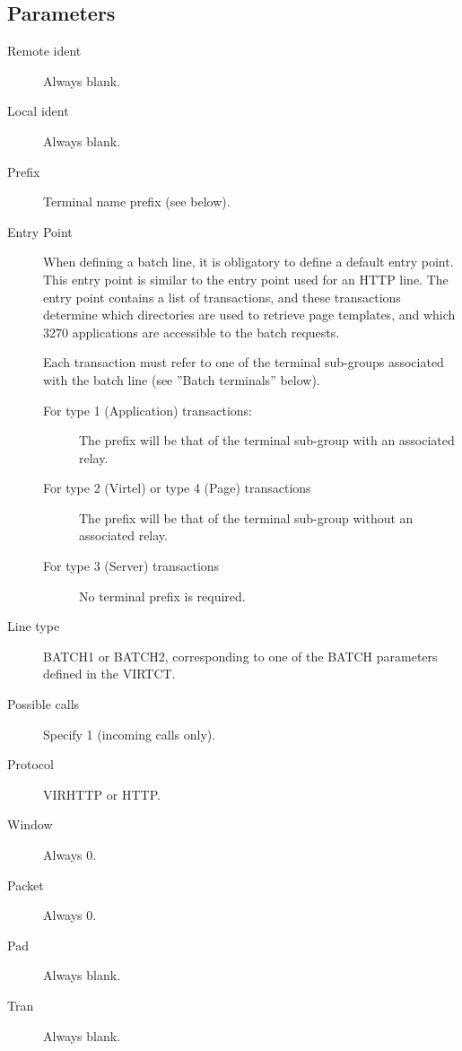 \documentclass[letterpaper,10pt,english]{sphinxmanual}
\begin{document}


\subsection{Parameters}
\label{\detokenize{connectivity_guide:id10}}\label{\detokenize{connectivity_guide:index-32}}\begin{description}
\item[{Remote ident}] \leavevmode
Always blank.

\item[{Local ident}] \leavevmode
Always blank.

\item[{Prefix}] \leavevmode
Terminal name prefix (see below).

\item[{Entry Point}] \leavevmode
When defining a batch line, it is obligatory to define a default entry point. This entry point is similar to the entry point used for an HTTP line. The entry point contains a list of transactions, and these transactions determine which directories are used to retrieve page templates, and which 3270 applications are accessible to the batch requests.

Each transaction must refer to one of the terminal sub-groups associated with the batch line (see ”Batch terminals” below).
\begin{description}
\item[{For type 1 (Application) transactions:}] \leavevmode
The prefix will be that of the terminal sub-group with an associated relay.

\item[{For type 2 (Virtel) or type 4 (Page) transactions}] \leavevmode
The prefix will be that of the terminal sub-group without an associated relay.

\item[{For type 3 (Server) transactions}] \leavevmode
No terminal prefix is required.

\end{description}

\item[{Line type}] \leavevmode
BATCH1 or BATCH2, corresponding to one of the BATCH parameters defined in the VIRTCT.

\item[{Possible calls}] \leavevmode
Specify 1 (incoming calls only).

\item[{Protocol}] \leavevmode
VIRHTTP or HTTP.

\item[{Window}] \leavevmode
Always 0.

\item[{Packet}] \leavevmode
Always 0.

\item[{Pad}] \leavevmode
Always blank.

\item[{Tran}] \leavevmode
Always blank.

\end{description}
\end{document}
